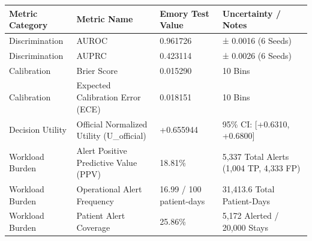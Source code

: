 \begin{tabular}{llll}
\toprule
Metric Category & Metric Name & Emory Test Value & Uncertainty / Notes \\
\midrule
Discrimination & AUROC & 0.961726 & ± 0.0016 (6 Seeds) \\
Discrimination & AUPRC & 0.423114 & ± 0.0026 (6 Seeds) \\
Calibration & Brier Score & 0.015290 & 10 Bins \\
Calibration & Expected Calibration Error (ECE) & 0.018151 & 10 Bins \\
Decision Utility & Official Normalized Utility (U\_official) & +0.655944 & 95\% CI: [+0.6310, +0.6800] \\
Workload Burden & Alert Positive Predictive Value (PPV) & 18.81\% & 5,337 Total Alerts (1,004 TP, 4,333 FP) \\
Workload Burden & Operational Alert Frequency & 16.99 / 100 patient-days & 31,413.6 Total Patient-Days \\
Workload Burden & Patient Alert Coverage & 25.86\% & 5,172 Alerted / 20,000 Stays \\
\bottomrule
\end{tabular}
